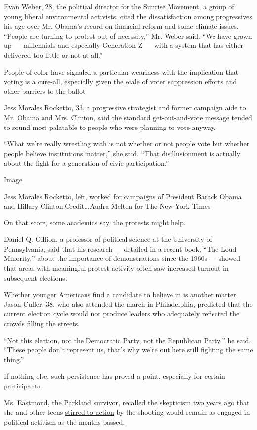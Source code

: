 Evan Weber, 28, the political director for the Sunrise Movement, a group
of young liberal environmental activists, cited the dissatisfaction
among progressives his age over Mr. Obama's record on financial reform
and some climate issues. ``People are turning to protest out of
necessity,'' Mr. Weber said. ``We have grown up --- millennials and
especially Generation Z --- with a system that has either delivered too
little or not at all.''

People of color have signaled a particular weariness with the
implication that voting is a cure-all, especially given the scale of
voter suppression efforts and other barriers to the ballot.

Jess Morales Rocketto, 33, a progressive strategist and former campaign
aide to Mr. Obama and Mrs. Clinton, said the standard get-out-and-vote
message tended to sound most palatable to people who were planning to
vote anyway.

``What we're really wrestling with is not whether or not people vote but
whether people believe institutions matter,'' she said. ``That
disillusionment is actually about the fight for a generation of civic
participation.''

Image

Jess Morales Rocketto, left, worked for campaigns of President Barack
Obama and Hillary Clinton.Credit...Audra Melton for The New York Times

On that score, some academics say, the protests might help.

Daniel Q. Gillion, a professor of political science at the University of
Pennsylvania, said that his research --- detailed in a recent book,
``The Loud Minority,'' about the importance of demonstrations since the
1960s --- showed that areas with meaningful protest activity often saw
increased turnout in subsequent elections.

Whether younger Americans find a candidate to believe in is another
matter. Jason Culler, 38, who also attended the march in Philadelphia,
predicted that the current election cycle would not produce leaders who
adequately reflected the crowds filling the streets.

``Not this election, not the Democratic Party, not the Republican
Party,'' he said. ``These people don't represent us, that's why we're
out here still fighting the same thing.''

If nothing else, such persistence has proved a point, especially for
certain participants.

Ms. Eastmond, the Parkland survivor, recalled the skepticism two years
ago that she and other teens
\href{https://www.nytimes.com/2018/04/01/us/politics/gun-control-marches-protests.html}{stirred
to action} by the shooting would remain as engaged in political activism
as the months passed.

